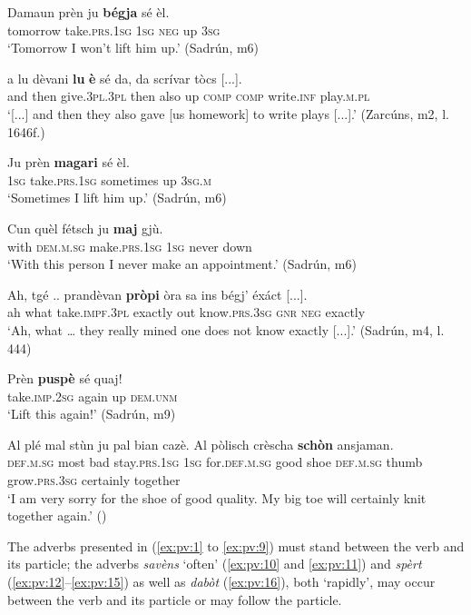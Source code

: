 \ea\label{ex:pv:3}
\gll   Damaun prèn ju \textbf{bégja} sé èl.\\
     tomorrow take.\textsc{prs.1sg} \textsc{1sg} \textsc{neg} up \textsc{3sg}\\
\glt `Tomorrow I won’t lift him up.' (Sadrún, m6)
\z

\ea\label{ex:pv:4}
\gll    [...] a lu dèvani \textbf{lu} \textbf{è} sé da, da scrívar tòcs [...].\\
{} and then give.\textsc{3pl.3pl} then also up \textsc{comp} \textsc{comp} write.\textsc{inf} play.\textsc{m.pl}\\
\glt `[...] and then they also gave [us homework] to write plays [...].' (Zarcúns, m2, l. 1646f.)
\z

\ea
\label{ex:pv:5}
\gll  Ju prèn \textbf{magari} sé èl.  \\
\textsc{1sg} take.\textsc{prs.1sg} sometimes up \textsc{3sg.m}\\
\glt `Sometimes I lift him up.' (Sadrún, m6)
\z

\ea
\label{ex:pv:6}
\gll  Cun quèl fétsch ju \textbf{maj} gjù.  \\
with \textsc{dem.m.sg} make.\textsc{prs.1sg} \textsc{1sg} never down\\
\glt `With this person I never make an appointment.' (Sadrún, m6)
\z

\ea
\label{ex:pv:7}
\gll   Ah, tgé .. prandèvan \textbf{pròpi} òra sa ins bégj' éxáct [...]. \\
ah what {} take.\textsc{impf.3pl} exactly out know.\textsc{prs.3sg} \textsc{gnr} \textsc{neg} exactly\\
\glt `Ah, what … they really mined one does not know exactly [...].' (Sadrún, m4, l. 444)
\z

\ea
\label{ex:pv:8}
\gll  Prèn \textbf{puspè} sé quaj! \\
take.\textsc{imp.2sg} again up \textsc{dem.unm}  \\
\glt `Lift this again!' (Sadrún, m9)
\z

\ea
\label{ex:pv:9}
\gll  Al plé mal stùn ju pal bian cazè. Al pòlisch crèscha \textbf{schòn} ansjaman.\\
     \textsc{def.m.sg}  most bad stay.\textsc{prs.1sg}  \textsc{1sg} for.\textsc{def.m.sg} good shoe \textsc{def.m.sg} thumb grow.\textsc{prs.3sg}  certainly together\\
\glt `I am very sorry for the shoe of good quality. My big toe will certainly knit together again.' (\citealt[51]{Berther1998})
\z

The adverbs presented in (\ref{ex:pv:1} to \ref{ex:pv:9}) must stand between the verb and its particle;  the adverbs \textit{savèns} `often' (\ref{ex:pv:10} and \ref{ex:pv:11}) and \textit{spèrt}  (\ref{ex:pv:12}--\ref{ex:pv:15}) as well as \textit{dabòt} (\ref{ex:pv:16}), both `rapidly', may occur between the verb and its particle or may follow the particle.

